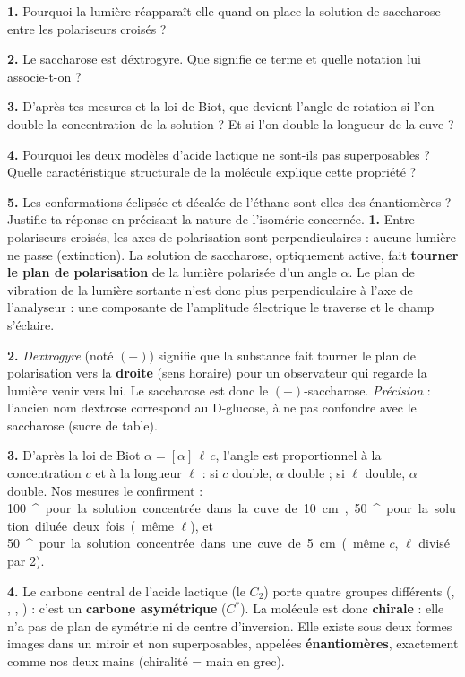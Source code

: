 \documentclass[11pt]{article}
\providecommand{\degree}{^{\circ}}
\begin{document}
\begin{exoresolu}
\textbf{1.} Pourquoi la lumière réapparaît-elle quand on place la solution de saccharose entre les polariseurs croisés ?

\textbf{2.} Le saccharose est déxtrogyre. Que signifie ce terme et quelle notation lui associe-t-on ?

\textbf{3.} D'après tes mesures et la loi de Biot, que devient l'angle de rotation si l'on double la concentration de la solution ? Et si l'on double la longueur de la cuve ?

\textbf{4.} Pourquoi les deux modèles d'acide lactique ne sont-ils pas superposables ? Quelle caractéristique structurale de la molécule explique cette propriété ?

\textbf{5.} Les conformations éclipsée et décalée de l'éthane sont-elles des énantiomères ? Justifie ta réponse en précisant la nature de l'isomérie concernée.
\tcblower
\textbf{1.} Entre polariseurs croisés, les axes de polarisation sont perpendiculaires : aucune lumière ne passe (extinction). La solution de saccharose, optiquement active, fait \textbf{tourner le plan de polarisation} de la lumière polarisée d'un angle $\alpha$. Le plan de vibration de la lumière sortante n'est donc plus perpendiculaire à l'axe de l'analyseur : une composante de l'amplitude électrique le traverse et le champ s'éclaire.

\textbf{2.} \emph{Dextrogyre} (noté $(+)$) signifie que la substance fait tourner le plan de polarisation vers la \textbf{droite} (sens horaire) pour un observateur qui regarde la lumière venir vers lui. Le saccharose est donc le $(+)$-saccharose. \emph{Précision} : l'ancien nom \og dextrose \fg{} correspond au D-glucose, à ne pas confondre avec le saccharose (sucre de table).

\textbf{3.} D'après la loi de Biot $\alpha = [\alpha]\,\ell\,c$, l'angle est proportionnel à la concentration $c$ et à la longueur $\ell$ : si $c$ double, $\alpha$ double ; si $\ell$ double, $\alpha$ double. Nos mesures le confirment : \SI{100}{\degree} pour la solution concentrée dans la cuve de \SI{10}{cm}, \SI{50}{\degree} pour la solution diluée deux fois (même $\ell$), et \SI{50}{\degree} pour la solution concentrée dans une cuve de \SI{5}{cm} (même $c$, $\ell$ divisé par 2).

\textbf{4.} Le carbone central de l'acide lactique (le $C_2$) porte quatre groupes différents (, , , ) : c'est un \textbf{carbone asymétrique} ($C^*$). La molécule est donc \textbf{chirale} : elle n'a pas de plan de symétrie ni de centre d'inversion. Elle existe sous deux formes images dans un miroir et non superposables, appelées \textbf{énantiomères}, exactement comme nos deux mains (chiralité = \og main \fg{} en grec).


\end{exoresolu}
\end{document}
